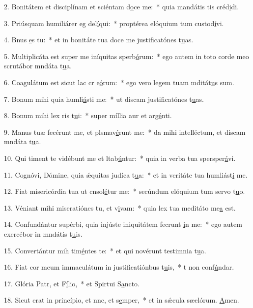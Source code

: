 2. Bonitátem et disciplínam et sciéntam d\uline{o}ce me:~* quia mandátis tis créd\uline{i}di.\par 
3. Priúsquam humiliárer eg del\uline{í}qui:~* proptérea elóquium tum custod\uline{í}vi.\par 
4. Bnus \uline{e}s tu:~* et in bonitáte tua doce me justificatónes t\uline{u}as.\par 
5. Multiplicáta est super me iníquitas sperb\uline{ó}rum:~* ego autem in toto corde meo scrutábor mndáta t\uline{u}a.\par 
6. Coagulátum est sicut lac cr e\uline{ó}rum:~* ego vero legem tuam mditát\uline{u}s sum.\par 
7. Bonum mihi quia humli\uline{á}sti me:~* ut discam justificatónes t\uline{u}as.\par 
8. Bonum mihi lex ris t\uline{u}i:~* super míllia aur et arg\uline{é}nti.\par 
9. Manus tuæ fecérunt me, et plsmav\uline{é}runt me:~* da mihi intelléctum, et discam mndáta t\uline{u}a.\par 
10. Qui timent te vidébunt me et ltab\uline{ú}ntur:~* quia in verba tua spersper\uline{á}vi.\par 
11. Cognóvi, Dómine, quia ǽquitas judíca t\uline{u}a:~* et in veritáte tua humliást\uline{i} me.\par 
12. Fiat misericórdia tua ut cnsol\uline{é}tur me:~* secúndum elóquium tum servo t\uline{u}o.\par 
13. Véniant mihi miseratiónes tu, et v\uline{i}vam:~* quia lex tua meditáto me\uline{a} est.\par 
14. Confundántur supérbi, quia injúste iniquitátem fecrunt \uline{i}n me:~* ego autem exercébor in mndátis t\uline{u}is.\par 
15. Convertántur mih tim\uline{é}ntes te:~* et qui novérunt testimnia t\uline{u}a.\par 
16. Fiat cor meum immaculátum in justificatiónbus t\uline{u}is,~* t non conf\uline{ú}ndar.\par 
17. Glória Patr, et F\uline{í}lio,~* et Spirtui S\uline{a}ncto.\par 
18. Sicut erat in princípio, et nnc, et s\uline{e}mper,~* et in sǽcula sæclórum. \uline{A}men.\par 
